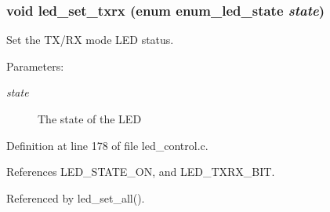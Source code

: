 \subsubsection[{led\_\-set\_\-txrx}]{\setlength{\rightskip}{0pt plus 5cm}void led\_\-set\_\-txrx (enum {\bf enum\_\-led\_\-state} {\em state})}\label{led__control_8h_7cfa42017a78de6f6b9eb9ec790b8261}


Set the TX/RX mode LED status. 

\begin{Desc}
\item[Parameters:]
\begin{description}
\item[{\em state}]The state of the LED \end{description}
\end{Desc}


Definition at line 178 of file led\_\-control.c.

References LED\_\-STATE\_\-ON, and LED\_\-TXRX\_\-BIT.

Referenced by led\_\-set\_\-all().